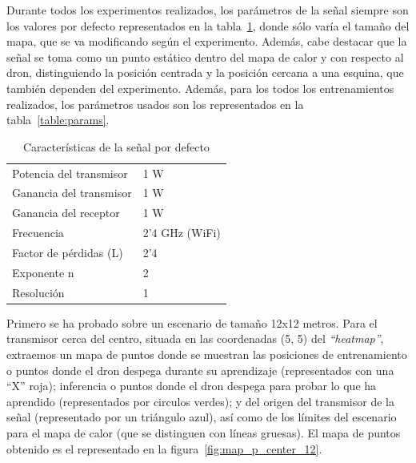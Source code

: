 Durante todos los experimentos realizados, los parámetros de la señal siempre son los valores por defecto representados en la tabla~\ref{table:compare_graph}, donde sólo varía el tamaño del mapa, que se va modificando según el experimento. Además, cabe destacar que la señal se toma como un punto estático dentro del mapa de calor y con respecto al dron, distinguiendo la posición centrada y la posición cercana a una esquina, que también dependen del experimento. Además, para los todos los entrenamientos realizados, los parámetros usados son los representados en la tabla~\ref{table:params}.\\

\begin{table}
    \centering
    \begin{tabular}{ll}
    Potencia del transmisor & 1 W            \\
    Ganancia del transmisor & 1 W            \\
    Ganancia del receptor   & 1 W            \\
    Frecuencia              & 2'4 GHz (WiFi) \\
    Factor de pérdidas (L)  & 2'4            \\
    Exponente n             & 2              \\
    Resolución              & 1              \\
    \end{tabular}
    \caption[Características de la señal por defecto]{Características de la señal por defecto}
    \label{table:compare_graph}
\end{table}

Primero se ha probado sobre un escenario de tamaño 12x12 metros. Para el transmisor cerca del centro, situada en las coordenadas (5, 5) del \emph{``heatmap''}, extraemos un mapa de puntos donde se muestran las posiciones de entrenamiento o puntos donde el dron despega durante su aprendizaje (representados con una ``X'' roja); inferencia o puntos donde el dron despega para probar lo que ha aprendido (representados por circulos verdes); y del origen del transmisor de la señal (representado por un triángulo azul), así como de los límites del escenario para el mapa de calor (que se distinguen con líneas gruesas). El mapa de puntos obtenido es el representado en la figura~\ref{fig:map_p_center_12}.\\

